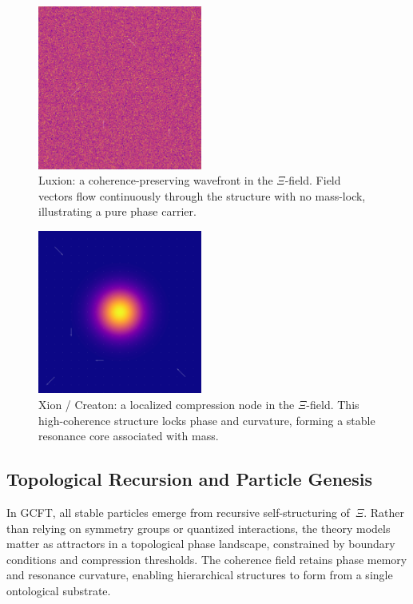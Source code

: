 \begin{figure}[ht]
\centering
\includegraphics[width=0.48\textwidth]{figures/xi_photon_modulus_vector_overlay.png}
\caption{Luxion: a coherence-preserving wavefront in the $\Xi$-field. Field vectors flow continuously through the structure with no mass-lock, illustrating a pure phase carrier.}
\label{fig:xi_photon_phase}
\end{figure}

\begin{figure}[ht]
\centering
\includegraphics[width=0.48\textwidth]{figures/xi_core_modulus_vector_overlay.png}
\caption{Xion / Creaton: a localized compression node in the $\Xi$-field. This high-coherence structure locks phase and curvature, forming a stable resonance core associated with mass.}
\label{fig:xi_core_structure}
\end{figure}

\subsection{Topological Recursion and Particle Genesis}

In GCFT, all stable particles emerge from recursive self-structuring of~$\Xi$. Rather than relying on symmetry groups or quantized interactions, the theory models matter as attractors in a topological phase landscape, constrained by boundary conditions and compression thresholds. The coherence field retains phase memory and resonance curvature, enabling hierarchical structures to form from a single ontological substrate.
